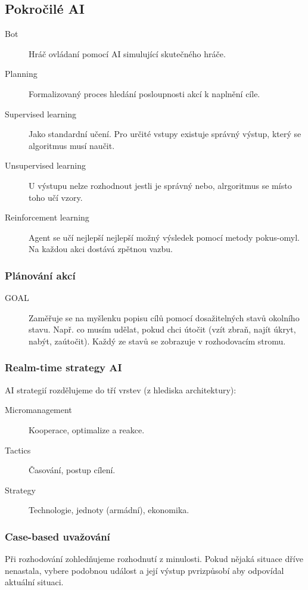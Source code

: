 \subsection*{Pokročilé AI}

\begin{description}
    \item[Bot] Hráč ovládaní pomocí AI simulující skutečného hráče.
    \item[Planning] Formalizovaný proces hledání posloupnosti akcí k naplnění cíle.
    \item[Supervised learning] Jako standardní učení. Pro určité vstupy existuje správný výstup, který se algoritmus musí naučit.
    \item[Unsupervised learning] U výstupu nelze rozhodnout jestli je správný nebo, alrgoritmus se místo toho učí vzory.
    \item[Reinforcement learning] Agent se učí nejlepší nejlepší možný výsledek pomocí metody pokus-omyl. Na každou akci dostává zpětnou vazbu.
\end{description}

\subsubsection*{Plánování akcí}

\begin{description}
    \item[GOAL] Zaměřuje se na myšlenku popisu cílů pomocí dosažitelných stavů okolního stavu. Např. co musím udělat, pokud chci útočit (vzít zbraň, najít úkryt, nabýt, zaútočit). Každý ze stavů se zobrazuje v rozhodovacím stromu.
\end{description}

\subsubsection*{Realm-time strategy AI}

AI strategií rozdělujeme do tří vrstev (z hlediska architektury):

\begin{description}
    \item[Micromanagement] Kooperace, optimalize a reakce.
    \item[Tactics] Časování, postup cílení.
    \item[Strategy] Technologie, jednoty (armádní), ekonomika.
\end{description}

\subsubsection*{Case-based uvažování}

Při rozhodování zohledňujeme rozhodnutí z minulosti.
Pokud nějaká situace dříve nenastala, vybere podobnou událost a její výstup pvrizpůsobí aby odpovídal aktuální situaci.
